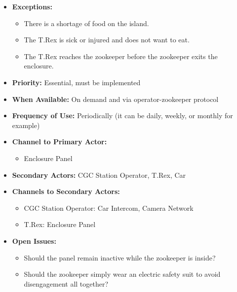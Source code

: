\documentclass[12pt]{article}
\begin{document}
\begin{itemize}
        \item[]\textbf{Exceptions:}
            \begin{itemize}
                \item[] There is a shortage of food on the island.
                \item[] The T.Rex is sick or injured and does not want to eat.
                \item[] The T.Rex reaches the zookeeper before the zookeeper exits the enclosure.
            \end{itemize}

        \item[]\textbf{Priority:}
            Essential, must be implemented

        \item[]\textbf{When Available:}
            On demand and via operator-zookeeper protocol

        \item[]\textbf{Frequency of Use:}
            Periodically (it can be daily, weekly, or monthly for example)

        \item[]\textbf{Channel to Primary Actor:}
            \begin{itemize}
                \item[] Enclosure Panel
            \end{itemize}

        \item[]\textbf{Secondary Actors:}
            CGC Station Operator, T.Rex, Car
        
        \item[]\textbf{Channels to Secondary Actors:}
            \begin{itemize}
                \item[] CGC Station Operator: Car Intercom, Camera Network
                \item[] T.Rex: Enclosure Panel
            \end{itemize}

        \item[]\textbf{Open Issues:}
            \begin{itemize}
                \item[] Should the panel remain inactive while 
                the zookeeper is inside?
                \item[] Should the zookeeper simply wear an electric 
                safety suit to avoid disengagement all together?
            \end{itemize}
    \end{itemize}
    
\end{document}
